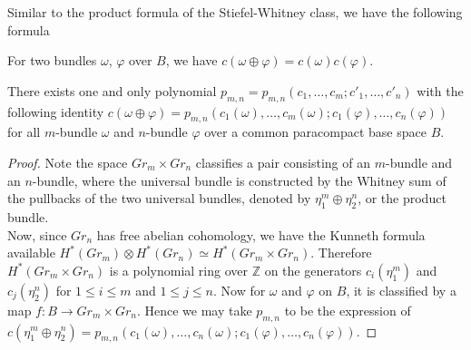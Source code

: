 	Similar to the product formula of the Stiefel-Whitney class, we have the following formula
	\begin{thm}\label{Chern_prod}
		For two bundles $\omega$, $\varphi$ over $B$, we have $c(\omega\oplus\varphi)=c(\omega)c(\varphi)$. 
	\end{thm}

	\begin{lemma}
		There exists one and only polynomial $p_{m,n}=p_{m,n}(c_1,\dots,c_m;c'_1,\dots,c'_n)$ with the following identity $c(\omega\oplus\varphi)=p_{m,n}(c_1(\omega),\dots,c_m(\omega);c_1(\varphi),\dots,c_n(\varphi))$ for all $m$-bundle $\omega$ and $n$-bundle $\varphi$ over a common paracompact base space $B$. 
	\end{lemma}
	\begin{proof}
		Note the space $Gr_m\times Gr_n$ classifies a pair consisting of an $m$-bundle and an $n$-bundle, where the universal bundle is constructed by the Whitney sum of the pullbacks of the two universal bundles, denoted by $\eta_1^m\oplus\eta_2^n$, or the product bundle. \\
		Now, since $Gr_n$ has free abelian cohomology, we have the Kunneth formula available $H^*(Gr_m)\otimes H^*(Gr_n)\simeq H^*(Gr_m\times Gr_n)$. Therefore $H^*(Gr_m\times Gr_n)$ is a polynomial ring over $\mathbb{Z}$ on the generators $c_i(\eta_1^m)$ and $c_j(\eta_2^n)$ for $1\le i\le m$ and $1\le j\le n$. Now for $\omega$ and $\varphi$ on $B$, it is classified by a map $f:B\to Gr_m\times Gr_n$. Hence we may take $p_{m,n}$ to be the expression of $c(\eta_1^m\oplus\eta_2^n)=p_{m,n}(c_1(\omega),\dots,c_n(\omega);c_1(\varphi),\dots,c_n(\varphi))$. 
	\end{proof}

